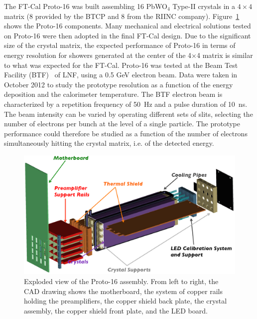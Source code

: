 The FT-Cal Proto-16 was built assembling 16 PbWO$_4$ Type-II crystals in a $4\times4$ matrix (8 provided by the BTCP and 8 from
the RIINC company). Figure~\ref{fig:p16-whole} shows the Proto-16 components. Many mechanical and electrical
solutions tested on Proto-16 were then adopted in the final FT-Cal design. Due to the significant size of the crystal
matrix, the expected performance of Proto-16 in terms of energy resolution for showers generated at the center
of the 4$\times$4 matrix is similar to what was expected for the FT-Cal. Proto-16 was tested at the Beam
Test Facility (BTF)~\cite{btf} of LNF, using a 0.5 GeV electron beam. Data were taken in October 2012 to study
the prototype resolution as a function of the energy deposition and the calorimeter temperature. The BTF electron
beam is characterized by a repetition frequency of 50~Hz and a pulse duration of 10~ns. The beam intensity can be
varied by operating different sets of slits, selecting the number of electrons per bunch at the level of a single
particle. The prototype performance could therefore be studied as a function of the number of electrons 
simultaneously hitting the crystal matrix, i.e. of the detected energy.

\begin{figure}
\includegraphics[width=1.0\columnwidth]{./fig/p16-whole.eps}
\caption{Exploded view of the Proto-16 assembly. From left to right, the CAD drawing shows the motherboard, the
  system of copper rails holding the preamplifiers, the copper shield back plate, the crystal assembly, the copper
  shield front plate, and the LED board.}
\label{fig:p16-whole}
\end{figure}

